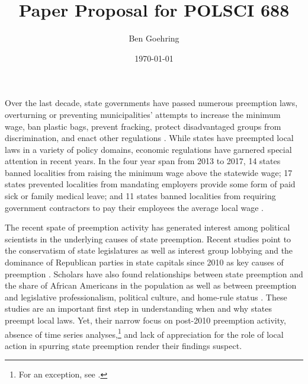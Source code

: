 \documentclass[12pt]{article}
\title{Paper Proposal for POLSCI 688}
\author{Ben Goehring}
\date{\today}
\begin{document}
\begin{titlepage}
\maketitle
\end{titlepage}
\hypersetup{pageanchor=false}


Over the last decade, state governments have passed numerous preemption laws, overturning or preventing municipalities' attempts to increase the minimum wage, ban plastic bags, prevent fracking, protect disadvantaged groups from discrimination, and enact other regulations \parencite{dupuisCityRightsEra2018,schraggerStatePreemptionLocal2017}. While states have preempted local laws in a variety of policy domains, economic regulations have garnered special attention in recent years. In the four year span from 2013 to 2017, 14 states banned localities from raising the minimum wage above the statewide wage; 17 states prevented localities from mandating employers provide some form of paid sick or family medical leave; and 11 states banned localities from requiring government contractors to pay their employees the average local wage \parencite{vonwilpertCityGovernmentsAre2017}.

The recent spate of preemption activity has generated interest among political scientists in the underlying causes of state preemption. Recent studies point to the conservatism of state legislatures \parencite{goodmanStateLegislativeIdeology2019} as well as interest group lobbying and the dominance of Republican parties in state capitals since 2010 as key causes of preemption \parencite{hicksHomeRuleBe2018,fowlerStatePreemptionLocal2019,flavinExplainingStatePreemption2019,riverstone-newellRiseStatePreemption2017}. Scholars have also found relationships between state preemption and the share of African Americans in the population \parencite{flavinExplainingStatePreemption2019} as well as between preemption and legislative professionalism, political culture, and home-rule status \parencite{fowlerStatePreemptionLocal2019}. These studies are an important first step in understanding when and why states preempt local laws. Yet, their narrow focus on post-2010 preemption activity, absence of time series analyses,\footnote{For an exception, see \textcite{goodmanStateLegislativeIdeology2019}.} and lack of appreciation for the role of local action in spurring state preemption render their findings suspect.
\end{document}
